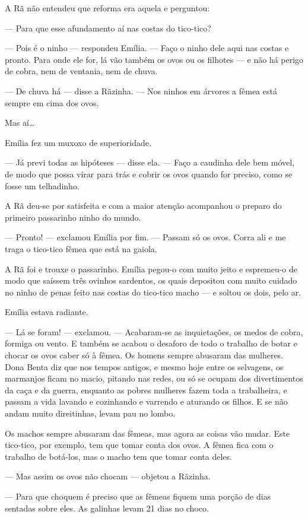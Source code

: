 A Rã não entendeu que reforma era aquela e perguntou:

--- Para que esse afundamento aí nas costas do tico-tico?

--- Pois é o ninho --- respondeu Emília. --- Faço o ninho dele aqui nas
costas e pronto. Para onde ele for, lá vão também os ovos ou os filhotes
--- e não há perigo de cobra, nem de ventania, nem de chuva.

--- De chuva há --- disse a Rãzinha. --- Nos ninhos em árvores a fêmea
está sempre em cima dos ovos.

Mas aí\ldots{}

Emília fez um muxoxo de superioridade.

--- Já previ todas as hipóteses --- disse ela. --- Faço a caudinha dele
bem móvel, de modo que possa virar para trás e cobrir os ovos quando for
preciso, como se fosse um telhadinho.

A Rã deu-se por satisfeita e com a maior atenção acompanhou o preparo do
primeiro passarinho ninho do mundo.

--- Pronto! --- exclamou Emília por fim. --- Passam só os ovos. Corra
ali e me traga o tico-tico fêmea que está na gaiola.

A Rã foi e trouxe o passarinho. Emília pegou-o com muito jeito e
espremeu-o de modo que saíssem três ovinhos sardentos, os quais
depositou com muito cuidado no ninho de penas feito nas costas do
tico-tico macho --- e soltou os dois, pelo ar.

Emília estava radiante.

--- Lá se foram! --- exclamou. --- Acabaram-se as inquietações, os medos
de cobra, formiga ou vento. E também se acabou o desaforo de todo o
trabalho de botar e chocar os ovos caber só à fêmea. Os homens sempre
abusaram das mulheres. Dona Benta diz que nos tempos antigos, e mesmo
hoje entre os selvagens, os marmanjos ficam no macio, pitando nas redes,
ou só se ocupam dos divertimentos da caça e da guerra, enquanto as
pobres mulheres fazem toda a trabalheira, e passam a vida lavando e
cozinhando e varrendo e aturando os filhos. E se não andam muito
direitinhas, levam pau no lombo.

Os machos sempre abusaram das fêmeas, mas agora as coisas vão mudar.
Este tico-tico, por exemplo, tem que tomar conta dos ovos. A fêmea fica
com o trabalho de botá-los, mas o macho tem que tomar conta deles.

--- Mas assim os ovos não chocam --- objetou a Rãzinha.

--- Para que choquem é preciso que as fêmeas fiquem uma porção de dias
sentadas sobre eles. As galinhas levam 21 dias no choco.

